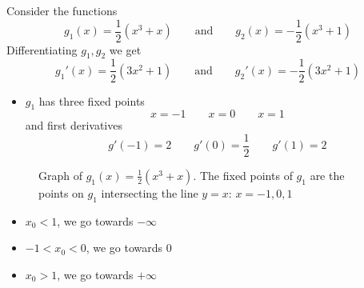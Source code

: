 \begin{example}
    Consider the functions
    \[
        g_1(x) = \frac{1}{2} \left( x^3 + x \right)
        \qquad \text{and} \qquad
        g_2(x) = -\frac{1}{2} \left( x^3 + 1 \right)
    \]
    Differentiating \( g_1, g_2 \) we get \[
        {g_1}'(x) = \frac{1}{2} (3x^2 + 1)
        \qquad \text{and} \qquad
        {g_2}'(x) = -\frac{1}{2} (3x^2 + 1)
    \]

    \begin{itemize}
        \item \( g_1 \) has three fixed points \[
                  x = -1 \qquad x = 0 \qquad x = 1
              \] and first derivatives \[
                  g'(-1) = 2 \qquad g'(0) = \frac{1}{2} \qquad g'(1) = 2
              \]
    \end{itemize}

    \begin{figure}[H]
        \centering
        \caption{Graph of \( g_1(x) = \frac{1}{2} (x^3 + x) \). The fixed points of \( g_1 \) are the points on \( g_1 \) intersecting the line \( y = x \): \( x = -1, 0, 1 \)}
    \end{figure}

    \begin{itemize}
        \item \( x_0 < 1 \), we go towards \( - \infty \)
        \item \( -1 < x_0 < 0 \), we go towards \( 0 \)
        \item \( x_0 > 1 \), we go towards \( + \infty \)
    \end{itemize}


\end{example}
